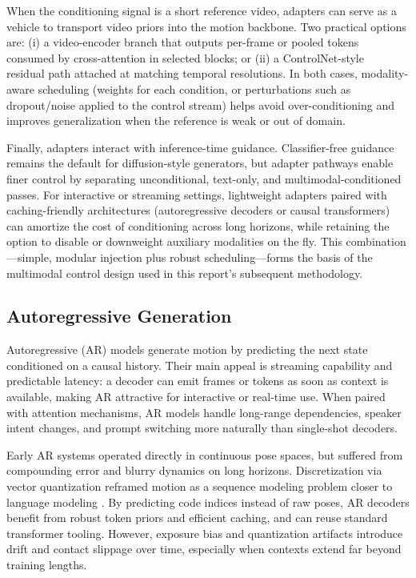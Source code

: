 \documentclass[a4paper,12pt]{article}
\begin{document}
When the conditioning signal is a short reference video, adapters can serve as a vehicle to transport video priors into the motion backbone. Two practical options are: (i) a video-encoder branch that outputs per-frame or pooled tokens consumed by cross-attention in selected blocks; or (ii) a ControlNet-style~\cite{zhang2023adding} residual path attached at matching temporal resolutions. In both cases, modality-aware scheduling (weights for each condition, or perturbations such as dropout/noise applied to the control stream) helps avoid over-conditioning and improves generalization when the reference is weak or out of domain.

Finally, adapters interact with inference-time guidance. Classifier-free guidance remains the default for diffusion-style generators, but adapter pathways enable finer control by separating unconditional, text-only, and multimodal-conditioned passes. For interactive or streaming settings, lightweight adapters paired with caching-friendly architectures (autoregressive decoders or causal transformers) can amortize the cost of conditioning across long horizons, while retaining the option to disable or downweight auxiliary modalities on the fly. This combination—simple, modular injection plus robust scheduling—forms the basis of the multimodal control design used in this report’s subsequent methodology.



\subsection{Autoregressive Generation}

Autoregressive (AR) models generate motion by predicting the next state conditioned on a causal history. Their main appeal is streaming capability and predictable latency: a decoder can emit frames or tokens as soon as context is available, making AR attractive for interactive or real-time use. When paired with attention mechanisms, AR models handle long-range dependencies, speaker intent changes, and prompt switching more naturally than single-shot decoders.

Early AR systems operated directly in continuous pose spaces, but suffered from compounding error and blurry dynamics on long horizons. Discretization via vector quantization reframed motion as a sequence modeling problem closer to language modeling \cite{zhang2023generating,jiang2024motiongpt}. By predicting code indices instead of raw poses, AR decoders benefit from robust token priors and efficient caching, and can reuse standard transformer tooling. However, exposure bias and quantization artifacts introduce drift and contact slippage over time, especially when contexts extend far beyond training lengths.
\end{document}
